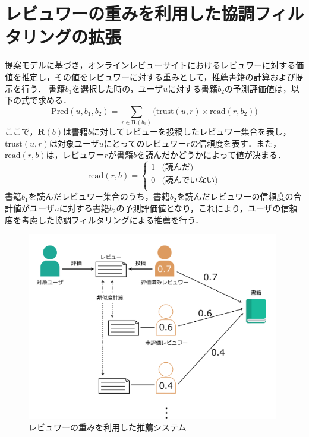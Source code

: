 \documentclass[a4paper,11pt,oneside,openany]{jsbook}
\begin{document}
\section{レビュワーの重みを利用した協調フィルタリングの拡張} %
\label{sec:reviewer_collaborative}
提案モデルに基づき，オンラインレビューサイトにおけるレビュワーに対する価値を推定し，その値をレビュワーに対する重みとして，推薦書籍の計算および提示を行う．
書籍$b_{1}$を選択した時の，ユーザ$u$に対する書籍$b_{2}$の予測評価値は，以下の式で求める．
\begin{equation}
\mathrm{Pred}( u, b_{1}, b_{2} ) = \sum_{r\in{\mathbf{R}(b_{1})}}\bigl({\mathrm{trust}( u , r )}\times {\mathrm{read}( r , b_{2} )}\bigr)
\end{equation}
ここで，$\mathbf{R}(b)$は書籍$b$に対してレビューを投稿したレビュワー集合を表し，$\mathrm{trust}(u,r)$は対象ユーザ$u$にとってのレビュワー$r$の信頼度を表す．また，$\mathrm{read}(r,b)$は，レビュワー$r$が書籍$b$を読んだかどうかによって値が決まる．
\begin{equation}
	\mathrm{read}(r,b) =\left\{ \begin{array}{ll}
		1 & \mbox{(読んだ)} \\
		0 & \mbox{(読んでいない)} \\
	\end{array} \right.
\end{equation}
書籍$b_{1}$を読んだレビュワー集合のうち，書籍$b_{2}$を読んだレビュワーの信頼度の合計値がユーザ$u$に対する書籍$b_{2}$の予測評価値となり，これにより，ユーザの信頼度を考慮した協調フィルタリングによる推薦を行う．
\begin{figure}[htb]
	\begin{center} %
		\includegraphics[width = 110mm]{figures/model.pdf} %
	\end{center}
	\caption{レビュワーの重みを利用した推薦システム} %
	\label{fig:model} %
\end{figure}
\end{document}
